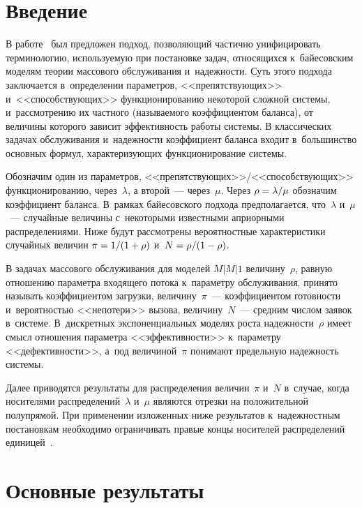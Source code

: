 \begin{multicols}{2}

\label{st\stat}

\section{Введение}

В работе~\cite{K2016} был предложен подход, позволя\-ющий частично унифицировать 
терминологию, используемую при постановке задач, относящихся к~байесовским 
моделям теории массового обслуживания и~надежности. Суть этого подхода 
заключается в~определении параметров, <<препятствующих>> и~<<способствующих>> 
функционированию некоторой сложной системы, и~рассмотрению их частного 
(называемого коэффициентом баланса), от величины которого зависит эффективность 
работы системы.
В классических задачах обслуживания и~надежности коэффициент баланса 
входит в~большинство основных формул, характеризующих функционирование системы.

Обозначим один из параметров, <<препятству\-ющих>>/<<способствующих>> функционированию, 
через~$\lambda$, а второй~--- через~$\mu$. Через $\rho\hm=\lambda/\mu$ обозначим 
коэффициент баланса. В~рамках байесовского подхода предполагается, что~$\lambda$ 
и~$\mu$~--- случайные величины с~некоторыми известными априорными распределениями. 
Ниже будут рассмотрены вероятностные характеристики случайных величин 
$\pi\hm=1/(1\hm+\rho)$ и~$N\hm=\rho/(1\hm-\rho)$.

В задачах массового обслуживания для моделей $M|M|1$ величину~$\rho$, равную 
отношению па\-ра\-мет\-ра входящего потока к~па\-ра\-мет\-ру обслуживания, принято называть 
коэффициентом загрузки, величину~$\pi$~--- коэффициентом готовности и~ве\-ро\-ят\-ностью 
<<непотери>> вызова, величину~$N$~--- средним числом заявок в~системе. 
В~дискретных экспоненциальных моделях роста надежности~$\rho$ имеет смысл отношения 
параметра <<эффективности>> к~па\-ра\-мет\-ру <<дефективности>>, а~под величиной~$\pi$ 
понимают предельную надежность системы.

Далее приводятся результаты для распределения величин~$\pi$ и~$N$ в~случае, 
когда носителями распределений~$\lambda$ и~$\mu$ являются отрезки на положительной 
полупрямой. При применении изложенных ниже результатов к~надежностным постановкам 
необходимо ограничивать правые концы носителей распределений единицей~\cite{KuSh2015}.

\section{Основные результаты}


\end{multicols}
